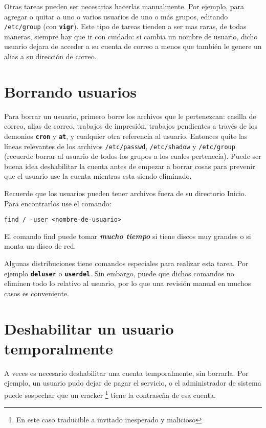 \documentclass[12pt]{article}
\begin{document}
Otras tareas pueden ser necesarias hacerlas manualmente. Por ejemplo,
para agregar o quitar a uno o varios usuarios
de uno o más grupos, editando \texttt{/etc/group} (con
\texttt{\textbf{vigr}}). Este tipo de tareas tienden a ser mas raras, de todas
maneras, siempre hay que ir con cuidado: si cambia un nombre de usuario, dicho
usuario dejara de acceder a su cuenta de correo a menos que también le genere un
alias a su dirección de correo.
	
\section*{Borrando usuarios}

Para borrar un usuario, primero borre los archivos que le pertenezcan:
casilla de correo, alias de correo, trabajos de impresión, trabajos pendientes a
través de los demonios \texttt{\textbf{cron}} y \texttt{\textbf{at}}, y
cualquier otra referencia al usuario.  Entonces quite las 
líneas relevantes de los archivos \texttt{/etc/passwd},  \texttt{/etc/shadow} y
\texttt{/etc/group} (recuerde borrar al usuario de todos los grupos
a los cuales pertenecía).  Puede ser buena idea deshabilitar la cuenta antes de
empezar a borrar cosas para prevenir que el usuario use la cuenta mientras esta
siendo eliminado.

Recuerde que los usuarios pueden tener archivos fuera de su directorio
Inicio.  Para encontrarlos use el comando:

 \texttt{find / -user <nombre-de-usuario>} 

El comando find puede tomar \textit{\bf mucho tiempo} si
tiene discos muy grandes o si monta un disco de red.

Algunas distribuciones tiene comandos especiales para realizar esta tarea. Por 
ejemplo \texttt{\textbf{deluser}} o \texttt{\textbf{userdel}}. Sin embargo, puede 
que dichos comandos no eliminen todo lo relativo al usuario, por lo que una 
revisión manual en muchos casos es conveniente.  



\section*{ Deshabilitar un usuario temporalmente}

A veces es necesario deshabilitar una cuenta temporalmente, sin borrarla.
Por ejemplo, un usuario pudo dejar de pagar el servicio, o el administrador de
sistema puede sospechar que un cracker	\footnote{En este caso traducible a 
invitado inesperado y malicioso} tiene la contraseña de esa cuenta.
\end{document}
